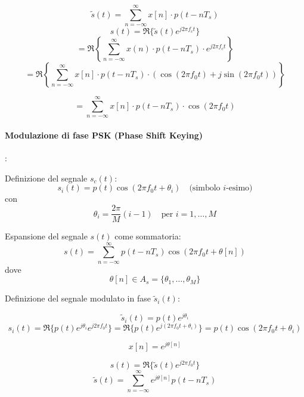\[
    \tilde{s}(t) = \sum_{n=-\infty}^{\infty} x[n]\cdot p(t - nT_s)
\]
\[
    s(t) = \Re\{\tilde{s}(t) e^{j2\pi f_c t}\}
\]
\[
    = \Re \left\{ \sum_{n=-\infty}^{\infty} x(n) \cdot p(t - nT_s) \cdot e^{j2\pi f_c t} \right\}
\]
\[
    = \Re \left\{ \sum_{n=-\infty}^{\infty} x[n] \cdot p(t - nT_s) \cdot (\cos(2\pi f_0 t) + j \sin(2\pi f_0 t)) \right\}
\]

\[
    = \sum_{n=-\infty}^{\infty} x[n] \cdot p(t - nT_s) \cdot \cos(2\pi f_0 t)
\]

\begin{center}
\end{center}


\paragraph*{ Modulazione di fase PSK (Phase Shift Keying)}:

Definizione del segnale \(s_c(t)\):
\[
    s_i(t) = p(t) \cos(2\pi f_0 t + \theta_i) \quad \text{(simbolo \(i\)-esimo)}
\]
con
\[
    \theta_i = \frac{2\pi}{M}(i-1) \quad \text{per \(i = 1, \ldots, M\)}
\]

Espansione del segnale \(s(t)\) come sommatoria:
\[
    s(t) = \sum_{n=-\infty}^{\infty} p(t - nT_s) \cos(2\pi f_0 t + \theta[n])
\]
dove
\[
    \theta[n] \in A_s = \{\theta_1, \ldots, \theta_M\}
\]

\noindent Definizione del segnale modulato in fase $\tilde{s}_i(t)$:

\[
    \tilde{s}_i(t) = p(t) e^{j\theta_i}
\]
\[
    s_i(t) = \Re\{p(t) e^{j\theta_i} e^{j2\pi f_0 t}\} = \Re\{p(t) e^{j(2\pi f_0 t + \theta_i)}\} = p(t) \cos(2\pi f_0 t + \theta_i)
\]

\[
    x[n] = e^{j\theta[n]}
\]

\begin{equation*}
    s(t) = \Re \{ \tilde{s}(t) e^{j 2\pi f_0 t} \}
\end{equation*}
\begin{equation*}
    \tilde{s}(t) = \sum_{n=-\infty}^{\infty} e^{j \theta[n]} p(t-nT_s)
\end{equation*}

